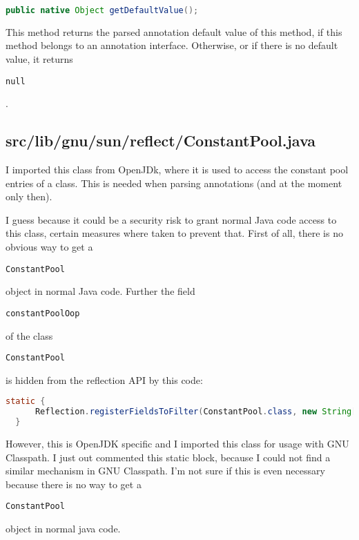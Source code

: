 \documentclass[a4paper, 10pt, titlepage]{scrartcl} %
\begin{document}
\begin{lstlisting}[language=Java]
  public native Object getDefaultValue();
\end{lstlisting}
This method returns the parsed annotation default value of this method, if this
method belongs to an annotation interface. Otherwise, or if there is no default
value, it returns \begin{scriptsize}\verb|null|\end{scriptsize}.

\subsection{src/lib/gnu/sun/reflect/ConstantPool.java}
\label{sec:src/lib/gnu/sun/reflect/ConstantPool.java}

I imported this class from OpenJDk, where it is used to access the constant
pool entries of a class. This is needed when parsing annotations (and at the
moment only then).

I guess because it could be a security risk to grant normal Java code access to
this class, certain measures where taken to prevent that. First of all, there
is no obvious way to get a \begin{scriptsize}\verb|ConstantPool|\end{scriptsize} object in normal Java code.
Further the field \begin{scriptsize}\verb|constantPoolOop|\end{scriptsize} of the class \begin{scriptsize}\verb|ConstantPool|\end{scriptsize} is
hidden from the reflection API by this code:
\begin{lstlisting}[language=Java,firstnumber=61]
  static {
      Reflection.registerFieldsToFilter(ConstantPool.class, new String[] { "constantPoolOop" });
  }
\end{lstlisting}
However, this is OpenJDK specific and I imported this class for usage with
GNU Classpath. I just out commented this static block, because I could not find
a similar mechanism in GNU Classpath. I'm not sure if this is even necessary
because there is no way to get a \begin{scriptsize}\verb|ConstantPool|\end{scriptsize} object in normal java code.
\end{document}
